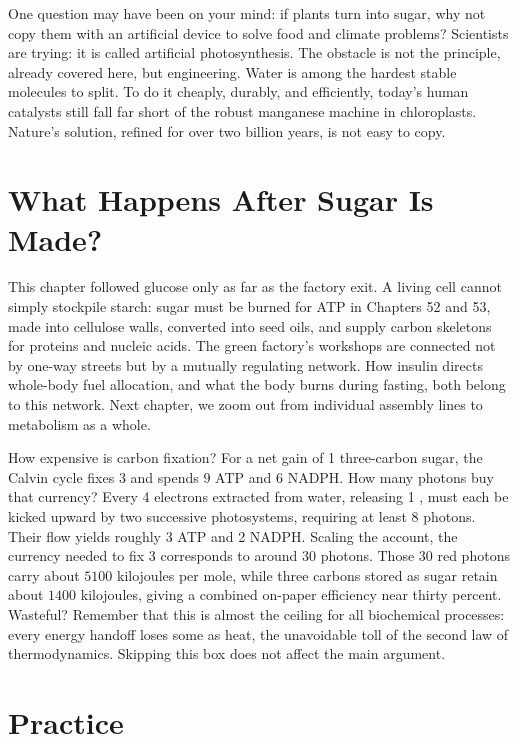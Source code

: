 One question may have been on your mind: if plants turn  into sugar, why not copy them with an artificial device to solve food and climate problems? Scientists are trying: it is called artificial photosynthesis. The obstacle is not the principle, already covered here, but engineering. Water is among the hardest stable molecules to split. To do it cheaply, durably, and efficiently, today's human catalysts still fall far short of the robust manganese machine in chloroplasts. Nature's solution, refined for over two billion years, is not easy to copy.

\section{What Happens After Sugar Is Made?}

This chapter followed glucose only as far as the factory exit. A living cell cannot simply stockpile starch: sugar must be burned for ATP in Chapters 52 and 53, made into cellulose walls, converted into seed oils, and supply carbon skeletons for proteins and nucleic acids. The green factory's workshops are connected not by one-way streets but by a mutually regulating network. How insulin directs whole-body fuel allocation, and what the body burns during fasting, both belong to this network. Next chapter, we zoom out from individual assembly lines to metabolism as a whole.

\begin{tiaozhan}
How expensive is carbon fixation? For a net gain of 1 three-carbon sugar, the Calvin cycle fixes 3  and spends 9 ATP and 6 NADPH. How many photons buy that currency? Every 4 electrons extracted from water, releasing 1 , must each be kicked upward by two successive photosystems, requiring at least $8$ photons. Their flow yields roughly 3 ATP and 2 NADPH. Scaling the account, the currency needed to fix 3  corresponds to around $30$ photons. Those 30 red photons carry about $5100$ kilojoules per mole, while three carbons stored as sugar retain about $1400$ kilojoules, giving a combined on-paper efficiency near thirty percent. Wasteful? Remember that this is almost the ceiling for all biochemical processes: every energy handoff loses some as heat, the unavoidable toll of the second law of thermodynamics. Skipping this box does not affect the main argument.
\end{tiaozhan}

\section*{Practice}

